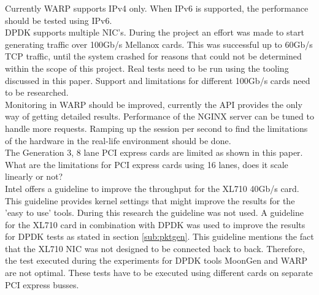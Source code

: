 Currently WARP supports IPv4 only. When IPv6 is supported, the performance should be tested using IPv6.  \\

DPDK supports multiple NIC's. During the project an effort was made to start generating traffic over 100Gb/s Mellanox cards.
This was successful up to 60Gb/s TCP traffic, until the system crashed for reasons that could not be determined within the scope of this project. Real tests need to be run using the tooling discussed in this paper. 
Support and limitations for different 100Gb/s cards need to be researched.\\

Monitoring in WARP should be improved, currently the API provides the only way of getting detailed results.
Performance of the NGINX server can be tuned to handle more requests. 
Ramping up the session per second to find the limitations of the hardware in the real-life environment should be done. \\ 

The Generation 3, 8 lane PCI express cards are limited as shown in this paper. What are the limitations for PCI express cards using 16 lanes, does it scale linearly or not? \\

Intel offers a guideline to improve the throughput for the XL710 40Gb/s card. This guideline provides kernel settings that might improve the results for the 'easy to use' tools.
During this research the guideline was not used. A guideline for the XL710 card in combination with DPDK was used to improve the results for DPDK tests as stated in section \ref{sub:pktgen}. 
This guideline mentions the fact that the XL710 NIC was not designed to be connected back to back. Therefore, the test executed during the experiments for DPDK tools MoonGen and WARP are not optimal.
These tests have to be executed using different cards on separate PCI express busses. \\

